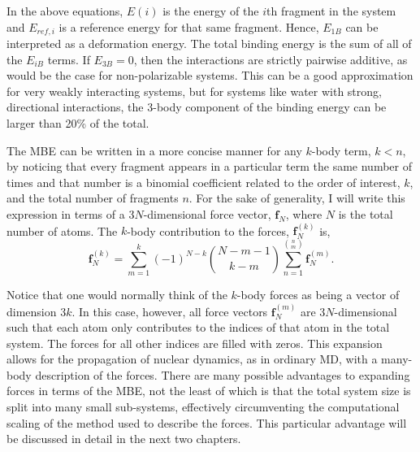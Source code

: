 \documentclass[11pt, proquest]{uwthesis}[2020/02/24]
\begin{document}
In the above equations, $E(i)$ is the energy of the $i$th fragment in the system and $E_{ref,i}$ is a reference energy for that same fragment. Hence, $E_{1B}$ can be interpreted as a deformation energy. The total binding energy is the sum of all of the $E_{iB}$ terms. If $E_{3B}=0$, then the interactions are strictly pairwise additive, as would be the case for non-polarizable systems. This can be a good approximation for very weakly interacting systems, but for systems like water with strong, directional interactions, the 3-body component of the binding energy can be larger than 20\% of the total.\autocite{xantheas_ab_1994}

\par The MBE can be written in a more concise manner for any $k$-body term, $k<n$, by noticing that every fragment appears in a particular term the same number of times and that number is a binomial coefficient related to the order of interest, $k$, and the total number of fragments $n$. For the sake of generality, I will write this expression in terms of a 3$N$-dimensional force vector, $\mathbf{f}_N$, where $N$ is the total number of atoms. The $k$-body contribution to the forces, $\mathbf{f}_N^{(k)}$ is,
\begin{equation}
    \mathbf{f}_N^{(k)}=\sum_{m=1}^k(-1)^{N-k}\binom{N-m-1}{k-m}\sum_{n=1}^{\binom{n}{m}}\mathbf{f}_N^{(m)}.
\end{equation}

Notice that one would normally think of the $k$-body forces as being a vector of dimension $3k$. In this case, however, all force vectors $\mathbf{f}_N^{(m)}$ are $3N$-dimensional such that each atom only contributes to the indices of that atom in the total system. The forces for all other indices are filled with zeros. This expansion allows for the propagation of nuclear dynamics, as in ordinary MD, with a many-body description of the forces. There are many possible advantages to expanding forces in terms of the MBE, not the least of which is that the total system size is split into many small sub-systems, effectively circumventing the computational scaling of the method used to describe the forces. This particular advantage will be discussed in detail in the next two chapters.
\end{document}
